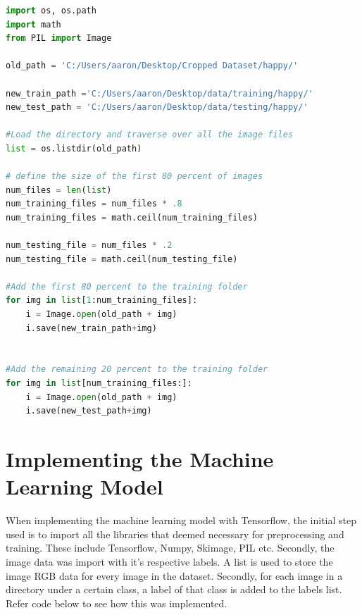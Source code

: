 \begin{lstlisting}[language=Python, frame=single]
import os, os.path
import math
from PIL import Image

old_path = 'C:/Users/aaron/Desktop/Cropped Dataset/happy/'

new_train_path ='C:/Users/aaron/Desktop/data/training/happy/'
new_test_path = 'C:/Users/aaron/Desktop/data/testing/happy/'

#Load the directory and traverse over all the image files
list = os.listdir(old_path)

# define the size of the first 80 percent of images
num_files = len(list)
num_training_files = num_files * .8
num_training_files = math.ceil(num_training_files)

num_testing_file = num_files * .2
num_testing_file = math.ceil(num_testing_file)

#Add the first 80 percent to the training folder
for img in list[1:num_training_files]: 
	i = Image.open(old_path + img)
	i.save(new_train_path+img)


#Add the remaining 20 percent to the training folder
for img in list[num_training_files:]:
	i = Image.open(old_path + img)
	i.save(new_test_path+img)
\end{lstlisting}

\section{Implementing the Machine Learning Model}

When implementing the machine learning model with Tensorflow, the initial step used is to import all the libraries that deemed necessary for preprocessing and training. These include Tensorflow, Numpy, Skimage, PIL etc. Secondly, the image data was import with it's respective labels. A list is used to store the image RGB data for every image in the dataset. Secondly, for each image in a directory under a certain class, a label of that class is added to the labels list. Refer code below to see how this was implemented.

